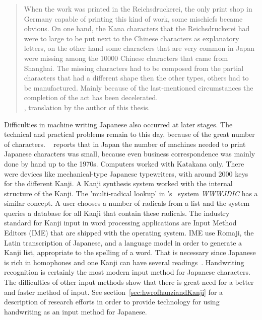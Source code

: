 \begin{quote}
When the work was printed in the Reichsdruckerei, the only print shop
in Germany capable of printing this kind of work, some mischiefs became obvious.
On one hand, the Kana characters that the Reichsdruckerei had were to large to
be put next to the Chinese characters as explanatory letters, on the other
hand some characters that are very common in Japan were missing among 
the 10000 Chinese characters that came from Shanghai.
The missing characters had to be composed from the partial characters that
had a different shape then the other types, others had to be manufactured.
Mainly because of the last-mentioned circumstances the completion of the
act has been decelerated.\\
, translation by the author of this thesis.
\end{quote}

Difficulties in machine writing Japanese also occurred at later stages. The 
technical and practical problems remain to this day, because of the great number
of characters. ~\citeyear{Foljanty1984} reports that 
in Japan the number of 
machines needed to print Japanese characters was small, because even business
correspondence was mainly done by hand up to the 1970s. Computers worked with
Katakana only. There were devices like mechanical-type Japanese typewriters,
with around 2000 keys for the different Kanji. A Kanji synthesis system worked
with the internal structure of the Kanji. The 'multi-radical lookup' in 
's~\citeyear{Breen2004} system \emph{WWWJDIC} has
a similar concept. A user chooses a number of radicals from a list and the 
system queries a database for all Kanji that contain these radicals.
The industry standard for Kanji input in word processing applications are 
Input Method Editors (IME) that are shipped with the operating system. 
IME use Romaji, the Latin transcription of Japanese, and 
a language model in order to generate a Kanji list, 
appropriate to the spelling of a word. 
That is necessary since Japanese is rich in homophones and one Kanji can 
have several readings~. 
Handwriting recognition is certainly the most modern input method for Japanese 
characters. The difficulties of other input methods show that there is 
great need for a better and faster method of input. See 
section~\ref{sec:hwrofhanziandKanji} for a description of research 
efforts in order to provide technology for using handwriting as an input method 
for Japanese.

